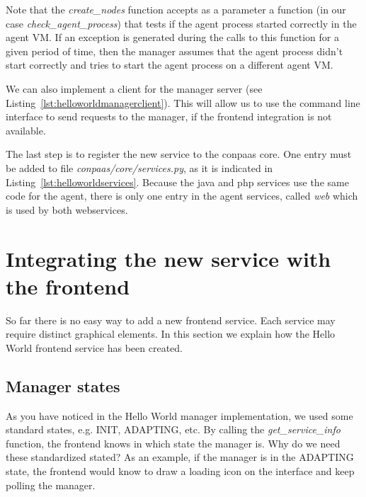 \documentclass[10pt]{article}
\newcommand{\ConPaaSHOME}{../conpaas-services}
\begin{document}
Note that the \textit{create\_nodes} function accepts as a parameter a function (in our case \textit{check\_agent\_process}) that tests if the agent process started correctly in the agent VM. If an exception is generated during the calls to this function for a given period of time, then the manager assumes that the agent process didn't start correctly and tries to start the agent process on a different agent VM.   



We can also implement a client for the manager server (see Listing~\ref{lst:helloworldmanagerclient}). This will allow us to use the command line interface to send requests to the manager, if the frontend integration is not available.



The last step is to register the new service to the conpaas core. One entry must be added to file \textit{conpaas/core/services.py}, as it is indicated in Listing~\ref{lst:helloworldservices}. Because the java and php services use the same code for the agent, there is only one entry in the agent services, called \textit{web} which is used by both webservices.




\section{Integrating the new service with the frontend}

So far there is no easy way to add a new frontend service. Each service may require distinct graphical elements. In this section we explain how the Hello World frontend service has been created.

\subsection{Manager states}
As you have noticed in the Hello World manager implementation, we used some standard states, e.g. INIT, ADAPTING, etc. By calling the \textit{get\_service\_info} function, the frontend knows in which state the manager is. Why do we need these standardized stated? As an example, if the manager is in the ADAPTING state, the frontend would know to draw a loading icon on the interface and keep polling the manager. 
\end{document}
